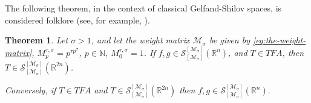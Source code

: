 \documentclass{article}
\theoremstyle{thmstyleone}
\newtheorem{Theorem}{Theorem}[section]%
\theoremstyle{thmstyletwo}%
\theoremstyle{thmstylethree}%
\begin{document}
The following theorem, in the context of classical Gelfand-Shilov spaces, is considered folklore (see, for example,   \cite{GZ, T2, Teo2018, Toft-2012}).
  

\begin{Theorem} \label{nec-suf-cond}
Let $\sigma>1$, and let the weight matrix $\mathcal{M}_\sigma$ be given by 
\eqref{eq:the-weight-matrix}, 
$ M_{p}^{\tau,\sigma}=p^{\tau p^\sigma}$, $ p\in \mathbb{N}$, $ M_0^{\tau,\sigma}=1$.
If $f,g \in    \mathcal S_{[\mathcal{M}_\sigma ]}^{[\mathcal{M}_\sigma]} (\mathbb R^{n}) $, 
and  $ T \in TFA$, then $ T   \in   \mathcal S_{[\mathcal{M}_\sigma ]}^{[\mathcal{M}_\sigma]} (\mathbb R^{2n})$.

Conversely, if  $ T \in TFA$ and $ T   \in   \mathcal S_{[\mathcal{M}_\sigma ]}^{[\mathcal{M}_\sigma]} (\mathbb R^{2n})$
then $f,g \in     \mathcal S_{[\mathcal{M}_\sigma ]}^{[\mathcal{M}_\sigma]} (\mathbb R^{n}).$
\end{Theorem}
\end{document}
